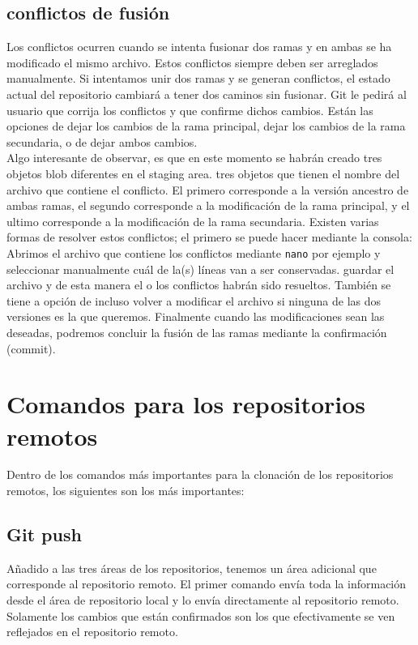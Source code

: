 \subsection{conflictos de fusión}

Los conflictos ocurren cuando se intenta fusionar dos ramas y en ambas se ha modificado el mismo archivo. Estos conflictos siempre deben ser arreglados manualmente. Si intentamos unir dos ramas y se generan conflictos, el estado actual del repositorio cambiará a tener dos caminos sin fusionar. Git le pedirá al usuario que corrija los conflictos y que confirme dichos cambios. Están las opciones de dejar los cambios de la rama principal, dejar los cambios de la rama secundaria, o de dejar ambos cambios. \\

Algo interesante de observar, es que en este momento se habrán creado tres objetos blob diferentes en el staging area. tres objetos que tienen el nombre del archivo que contiene el conflicto. El primero corresponde a la versión ancestro de ambas ramas, el segundo corresponde a la modificación de la rama principal, y el ultimo corresponde a la modificación de la rama secundaria. Existen varias formas de resolver estos conflictos; el primero se puede hacer mediante la consola: \\

Abrimos el archivo que contiene los conflictos mediante \texttt{nano} por ejemplo y seleccionar manualmente cuál de la(s) líneas van a ser conservadas. guardar el archivo y de esta manera el o los conflictos habrán sido resueltos. También se tiene a opción de incluso volver a modificar el archivo si ninguna de las dos versiones es la que queremos. Finalmente cuando las modificaciones sean las deseadas, podremos concluir la fusión de las ramas mediante la confirmación (commit). 

\section{Comandos para los repositorios remotos}

Dentro de los comandos más importantes para la clonación de los repositorios remotos, los siguientes son los más importantes:

\subsection{Git push}

Añadido a las tres áreas de los repositorios, tenemos un área adicional que corresponde al repositorio remoto. El primer comando envía toda la información desde el área de repositorio local y lo envía directamente al repositorio remoto. Solamente los cambios que están confirmados son los que efectivamente se ven reflejados en el repositorio remoto. 

